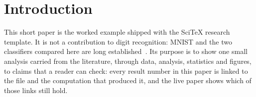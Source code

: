 \section{Introduction}

This short paper is the worked example shipped with the SciTeX research
template. It is not a contribution to digit recognition: MNIST and the two
classifiers compared here are long established~\citep{lecun1998gradient,cortes1995support}.
Its purpose is to show one small analysis carried from the literature,
through data, analysis, statistics and figures, to claims that a reader
can check: every result number in this paper is linked to the file and
the computation that produced it, and the live paper shows which of those
links still hold.

